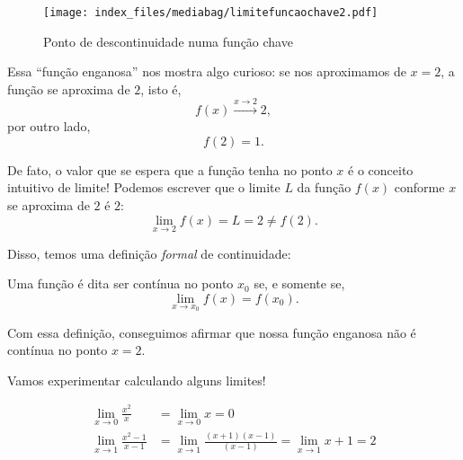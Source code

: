 \documentclass[
  portuguese,
  letterpaper,
  DIV=11,
  numbers=noendperiod]{scrreport}
\begin{document}
\begin{figure}[H]

\caption{Ponto de descontinuidade numa função chave}

{\centering \texttt{[image: index\_files/mediabag/limitefuncaochave2.pdf]}

}

\end{figure}%

Essa ``função enganosa'' nos mostra algo curioso: se nos aproximamos de
\(x=2\), a função se aproxima de \(2\), isto é, \[
f(x) \stackrel{x\rightarrow 2}{\rightarrow} 2,
\] por outro lado, \[
f(2) = 1.
\]

De fato, o valor que se espera que a função tenha no ponto \(x\) é o
conceito intuitivo de limite! Podemos escrever que o limite \(L\) da
função \(f(x)\) conforme \(x\) se aproxima de \(2\) é \(2\): \[
\lim_{x\rightarrow 2} f(x) = L = 2 \neq f(2).
\]

Disso, temos uma definição \emph{formal} de continuidade:

\begin{tcolorbox}[enhanced jigsaw, leftrule=.75mm, coltitle=black, title=\textcolor{quarto-callout-note-color}{\faInfo}\hspace{0.5em}{Definição de continuidade}, colbacktitle=quarto-callout-note-color!10!white, colback=white, colframe=quarto-callout-note-color-frame, left=2mm, bottomtitle=1mm, titlerule=0mm, breakable, opacityback=0, opacitybacktitle=0.6, arc=.35mm, toptitle=1mm, rightrule=.15mm, bottomrule=.15mm, toprule=.15mm]

Uma função é dita ser contínua no ponto \(x_0\) se, e somente se, \[
\lim_{x\rightarrow x_0} f(x) = f(x_0).
\]

\end{tcolorbox}

Com essa definição, conseguimos afirmar que nossa função enganosa não é
contínua no ponto \(x=2\).

Vamos experimentar calculando alguns limites!

\[
\begin{aligned}
\lim_{x \rightarrow 0} \frac{x^2}{x} &= \lim_{x\rightarrow 0} x = 0 \\
\lim_{x\rightarrow 1} \frac{x^2 - 1}{x - 1} &= \lim_{x\rightarrow 1} \frac{(x+1)(x-1)}{(x-1)} = \lim_{x\rightarrow 1} x+1 = 2
\end{aligned}
\]
\end{document}
